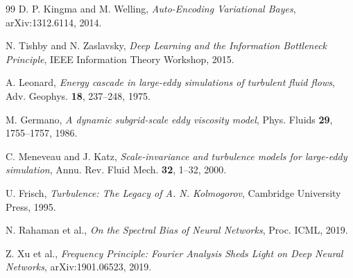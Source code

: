 \documentclass[reprint,aps,pre]{revtex4-2}
\begin{document}
\begin{thebibliography}{99}
D. P. Kingma and M. Welling, \textit{Auto-Encoding Variational Bayes}, arXiv:1312.6114, 2014.

N. Tishby and N. Zaslavsky, \textit{Deep Learning and the Information Bottleneck Principle}, IEEE Information Theory Workshop, 2015.

A. Leonard, \textit{Energy cascade in large-eddy simulations of turbulent fluid flows}, Adv. Geophys. \textbf{18}, 237--248, 1975.

M. Germano, \textit{A dynamic subgrid-scale eddy viscosity model}, Phys. Fluids \textbf{29}, 1755--1757, 1986.

C. Meneveau and J. Katz, \textit{Scale-invariance and turbulence models for large-eddy simulation}, Annu. Rev. Fluid Mech. \textbf{32}, 1--32, 2000.

U. Frisch, \textit{Turbulence: The Legacy of A. N. Kolmogorov}, Cambridge University Press, 1995.

N. Rahaman et al., \textit{On the Spectral Bias of Neural Networks}, Proc. ICML, 2019.

Z. Xu et al., \textit{Frequency Principle: Fourier Analysis Sheds Light on Deep Neural Networks}, arXiv:1901.06523, 2019.

\end{thebibliography}
\end{document}
